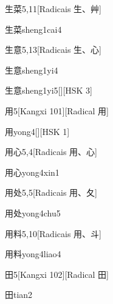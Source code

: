 \begin{entry}{生菜}{5,11}[Radicais ⽣、⾋]
  \begin{phonetics}{生菜}{sheng1cai4}
  \end{phonetics}
\end{entry}

\begin{entry}{生意}{5,13}[Radicais ⽣、⼼]
  \begin{phonetics}{生意}{sheng1yi4}
  \end{phonetics}
  \begin{phonetics}{生意}{sheng1yi5}[][HSK 3]
  \end{phonetics}
\end{entry}

\begin{entry}{用}{5}[Kangxi 101][Radical ⽤]
  \begin{phonetics}{用}{yong4}[][HSK 1]
  \end{phonetics}
\end{entry}

\begin{entry}{用心}{5,4}[Radicais ⽤、⼼]
  \begin{phonetics}{用心}{yong4xin1}
  \end{phonetics}
\end{entry}

\begin{entry}{用处}{5,5}[Radicais ⽤、⼡]
  \begin{phonetics}{用处}{yong4chu5}
  \end{phonetics}
\end{entry}

\begin{entry}{用料}{5,10}[Radicais ⽤、⽃]
  \begin{phonetics}{用料}{yong4liao4}
  \end{phonetics}
\end{entry}

\begin{entry}{田}{5}[Kangxi 102][Radical ⽥]
  \begin{phonetics}{田}{tian2}
  \end{phonetics}
\end{entry}

